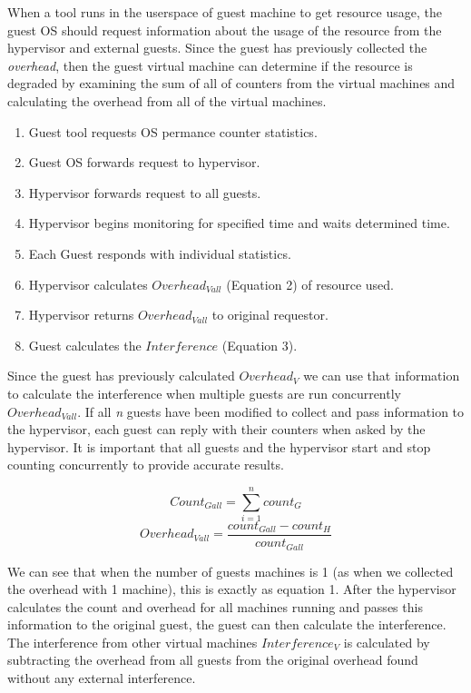 \indent When a tool runs in the userspace of guest machine to get resource usage, the guest OS should request information about the usage of the resource from the hypervisor and external guests.  Since the guest has previously collected the \emph{overhead}, then the guest virtual machine can determine if the resource is degraded by examining the sum of all of counters from the virtual machines and calculating the overhead from all of the virtual machines.

\begin{enumerate}
	\item Guest tool requests OS permance counter statistics.
	\item Guest OS forwards request to hypervisor.
	\item Hypervisor forwards request to all guests.
	\item Hypervisor begins monitoring for specified time and waits determined time.
	\item Each Guest responds with individual statistics.
	\item Hypervisor calculates $Overhead_{Vall}$ (Equation 2) of resource used.
	\item Hypervisor returns $Overhead_{Vall}$ to original requestor.
	\item Guest calculates the $Interference$ (Equation 3).
\end{enumerate}

\indent Since the guest has previously calculated $ Overhead_V $ we can use that information to calculate the interference when multiple guests are run concurrently $ Overhead_{Vall} $.  If all \emph{n} guests have been modified to collect and pass information to the hypervisor, each guest can reply with their counters when asked by the hypervisor.  It is important that all guests and the hypervisor start and stop counting concurrently to provide accurate results.  

\[ Count_{Gall} = \sum_{i=1}^n{count_G} \] 
\begin{equation}
Overhead_{Vall} = \frac{count_{Gall} - count_H}{count_{Gall}} 
\label{eq2}
\end{equation}

\indent We can see that when the number of guests machines is 1 (as when we collected the overhead with 1 machine), this is exactly as equation 1.  After the hypervisor calculates the count and overhead for all machines running and passes this information to the original guest, the guest can then calculate the interference.  
The interference from other virtual machines $Interference_V$ is calculated by subtracting the overhead from all guests from the original overhead found without any external interference. 

